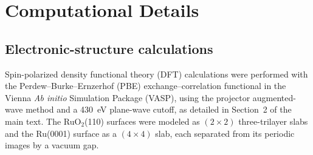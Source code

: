 %
%
%
%

\section*{Computational Details}

\subsection*{Electronic-structure calculations}
Spin-polarized density functional theory (DFT) calculations were performed with
the Perdew--Burke--Ernzerhof (PBE) exchange--correlation functional in the Vienna
\textit{Ab initio} Simulation Package (VASP), using the projector augmented-wave
method and a 430~eV plane-wave cutoff, as detailed in Section~2 of the main text.
The RuO$_2$(110) surfaces were modeled as $(2\times2)$ three-trilayer slabs and
the Ru(0001) surface as a $(4\times4)$ slab, each separated from its periodic
images by a vacuum gap.

